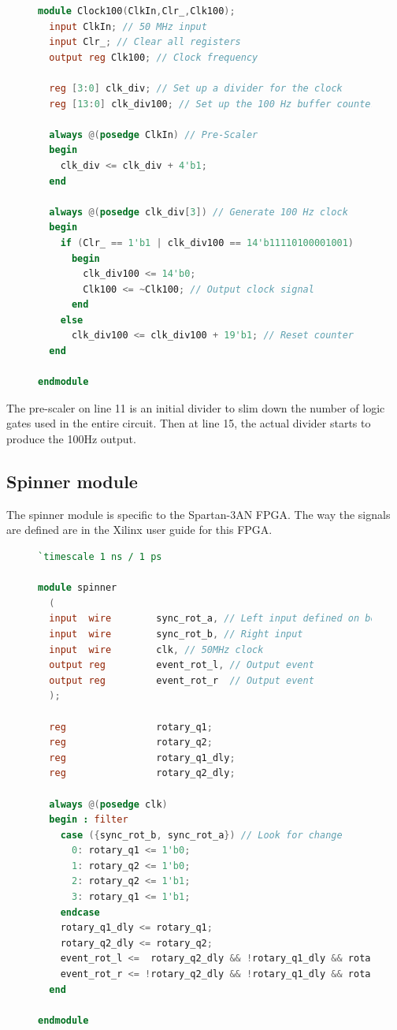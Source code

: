 \documentclass[12pt,a4paper,hidelinks]{article}            %
\begin{document}
\begin{figure}[H]
\centering
\begin{lstlisting}[language=Verilog]
module Clock100(ClkIn,Clr_,Clk100);
  input ClkIn; // 50 MHz input
  input Clr_; // Clear all registers
  output reg Clk100; // Clock frequency

  reg [3:0] clk_div; // Set up a divider for the clock
  reg [13:0] clk_div100; // Set up the 100 Hz buffer counter

  always @(posedge ClkIn) // Pre-Scaler
  begin
    clk_div <= clk_div + 4'b1;
  end

  always @(posedge clk_div[3]) // Generate 100 Hz clock
  begin
    if (Clr_ == 1'b1 | clk_div100 == 14'b11110100001001)
      begin
        clk_div100 <= 14'b0;
        Clk100 <= ~Clk100; // Output clock signal
      end
    else
      clk_div100 <= clk_div100 + 19'b1; // Reset counter
  end

endmodule
\end{lstlisting}
\label{fig:clockmodule}
\end{figure}

The pre-scaler on line 11 is an initial divider to slim down the number of logic gates used in the entire circuit. Then at line 15, the actual divider starts to produce the 100Hz output.

\subsection{Spinner module}

The spinner module is specific to the Spartan-3AN FPGA. The way the signals are defined are in the Xilinx user guide for this FPGA.

\begin{figure}[H]
\centering
\begin{lstlisting}[language=Verilog]
`timescale 1 ns / 1 ps

module spinner
  (
  input  wire        sync_rot_a, // Left input defined on board
  input  wire        sync_rot_b, // Right input
  input  wire        clk, // 50MHz clock
  output reg         event_rot_l, // Output event
  output reg         event_rot_r  // Output event
  );

  reg                rotary_q1;
  reg                rotary_q2;
  reg                rotary_q1_dly;
  reg                rotary_q2_dly;

  always @(posedge clk)
  begin : filter
    case ({sync_rot_b, sync_rot_a}) // Look for change
      0: rotary_q1 <= 1'b0;
      1: rotary_q2 <= 1'b0;
      2: rotary_q2 <= 1'b1;
      3: rotary_q1 <= 1'b1;
    endcase
    rotary_q1_dly <= rotary_q1;
    rotary_q2_dly <= rotary_q2;
    event_rot_l <=  rotary_q2_dly && !rotary_q1_dly && rotary_q1;
    event_rot_r <= !rotary_q2_dly && !rotary_q1_dly && rotary_q1;
  end

endmodule
\end{lstlisting}
\label{fig:spinnermodule}
\end{figure}
\end{document}
